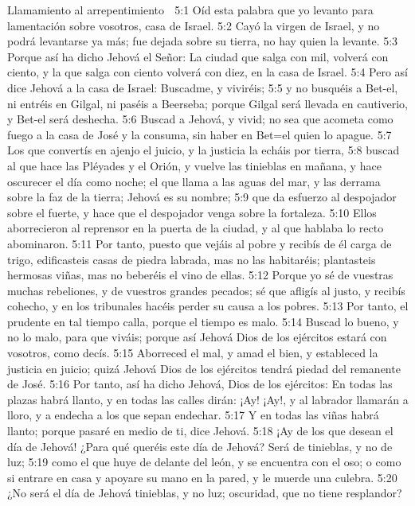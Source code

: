 Llamamiento al arrepentimiento  

5:1 Oíd esta palabra que yo levanto para lamentación sobre vosotros, casa de Israel.  
5:2 Cayó la virgen de Israel, y no podrá levantarse ya más; fue dejada sobre su tierra, no hay quien la levante.  
5:3 Porque así ha dicho Jehová el Señor: La ciudad que salga con mil, volverá con ciento, y la que salga con ciento volverá con diez, en la casa de Israel.  
5:4 Pero así dice Jehová a la casa de Israel: Buscadme, y viviréis;  
5:5 y no busquéis a Bet-el, ni entréis en Gilgal, ni paséis a Beerseba; porque Gilgal será llevada en cautiverio, y Bet-el será deshecha.  
5:6 Buscad a Jehová, y vivid; no sea que acometa como fuego a la casa de José y la consuma, sin haber en Bet=el quien lo apague.  
5:7 Los que convertís en ajenjo el juicio, y la justicia la echáis por tierra,  
5:8 buscad al que hace las Pléyades y el Orión, y vuelve las tinieblas en mañana, y hace oscurecer el día como noche; el que llama a las aguas del mar, y las derrama sobre la faz de la tierra; Jehová es su nombre;  
5:9 que da esfuerzo al despojador sobre el fuerte, y hace que el despojador venga sobre la fortaleza.  
5:10 Ellos aborrecieron al reprensor en la puerta de la ciudad, y al que hablaba lo recto abominaron.  
5:11 Por tanto, puesto que vejáis al pobre y recibís de él carga de trigo, edificasteis casas de piedra labrada, mas no las habitaréis; plantasteis hermosas viñas, mas no beberéis el vino de ellas.  
5:12 Porque yo sé de vuestras muchas rebeliones, y de vuestros grandes pecados; sé que afligís al justo, y recibís cohecho, y en los tribunales hacéis perder su causa a los pobres.  
5:13 Por tanto, el prudente en tal tiempo calla, porque el tiempo es malo.  
5:14 Buscad lo bueno, y no lo malo, para que viváis; porque así Jehová Dios de los ejércitos estará con vosotros, como decís.  
5:15 Aborreced el mal, y amad el bien, y estableced la justicia en juicio; quizá Jehová Dios de los ejércitos tendrá piedad del remanente de José.  
5:16 Por tanto, así ha dicho Jehová, Dios de los ejércitos: En todas las plazas habrá llanto, y en todas las calles dirán: ¡Ay! ¡Ay!, y al labrador llamarán a lloro, y a endecha a los que sepan endechar.  
5:17 Y en todas las viñas habrá llanto; porque pasaré en medio de ti, dice Jehová.  
5:18 ¡Ay de los que desean el día de Jehová! ¿Para qué queréis este día de Jehová? Será de tinieblas, y no de luz;  
5:19 como el que huye de delante del león, y se encuentra con el oso; o como si entrare en casa y apoyare su mano en la pared, y le muerde una culebra.  
5:20 ¿No será el día de Jehová tinieblas, y no luz; oscuridad, que no tiene resplandor?  
